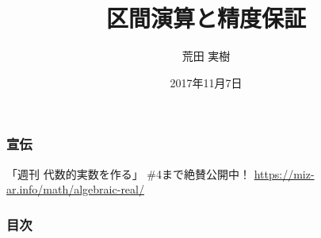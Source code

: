 \documentclass[aspectratio=169]{beamer}
\title{区間演算と精度保証}
\author{荒田 実樹}
\date{2017年11月7日}
\begin{document}
\begin{frame}[plain]\frametitle{宣伝}
  \centering
  \hspace{0.5em}
  \begin{minipage}{22em}
    「週刊 代数的実数を作る」 \newline
    \#4まで絶賛公開中！ \newline
    \url{https://miz-ar.info/math/algebraic-real/}
  \end{minipage}
\end{frame}
\begin{frame}\frametitle{}
  \titlepage
\end{frame}
\begin{frame}\frametitle{目次}
  \tableofcontents
\end{frame}
\end{document}
